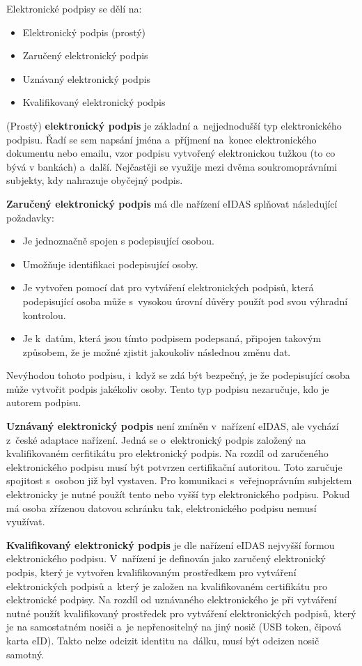 Elektronické podpisy se dělí na:

\begin{itemize}
    \item Elektronický podpis (prostý)
    \item Zaručený elektronický podpis
    \item Uznávaný elektronický podpis
    \item Kvalifikovaný elektronický podpis
\end{itemize}

(Prostý) \textbf{elektronický podpis} je základní a~nejjednodušší typ elektronického podpisu. Řadí se sem napsání jména a~příjmení na~konec elektronického dokumentu nebo emailu, vzor podpisu vytvořený elektronickou tužkou (to co bývá v bankách) a~další. Nejčastěji se využije mezi dvěma soukromoprávními subjekty, kdy nahrazuje obyčejný podpis.

\textbf{Zaručený elektronický podpis} má dle nařízení eIDAS splňovat následující požadavky:

\begin{itemize}
    \item Je jednoznačně spojen s podepisující osobou.
    \item Umožňuje identifikaci podepisující osoby.
    \item Je vytvořen pomocí dat pro vytváření elektronických podpisů, která podepisující osoba může s~vysokou úrovní důvěry použít pod svou výhradní kontrolou.
    \item Je k~datům, která jsou tímto podpisem podepsaná, připojen takovým způsobem, že je možné zjistit jakoukoliv následnou změnu dat.
\end{itemize}

Nevýhodou tohoto podpisu, i~když se zdá být bezpečný, je že podepisující osoba může vytvořit podpis jakékoliv osoby. Tento typ podpisu nezaručuje, kdo je autorem podpisu.

\textbf{Uznávaný elektronický podpis} není zmíněn v~nařízení eIDAS, ale vychází z~české adaptace nařízení. Jedná se o~elektronický podpis založený na kvalifikovaném cerfitikátu pro elektronický podpis. Na rozdíl od zaručeného elektronického podpisu musí být potvrzen certifikační autoritou. Toto zaručuje spojitost s~osobou již byl vystaven. Pro komunikaci s~veřejnoprávním subjektem elektronicky je nutné použít tento nebo vyšší typ elektronického podpisu. Pokud má osoba zřízenou datovou schránku tak, elektronického podpisu nemusí využívat.

\textbf{Kvalifikovaný elektronický podpis} je dle nařízení eIDAS nejvyšší formou elektronického podpisu. V~nařízení je definován jako zaručený elektronický podpis, který je vytvořen kvalifikovaným prostředkem pro vytváření elektronických podpisů a~který je založen na kvalifikovaném certifikátu pro elektronické podpisy. Na rozdíl od uznávaného elektronického je při vytváření nutné použít kvalifikovaný prostředek pro vytváření elektronických podpisů, který je na samostatném nosiči a~je nepřenositelný na jiný nosič (USB token, čipová karta eID). Takto nelze odcizit identitu na~dálku, musí být odcizen nosič samotný.


